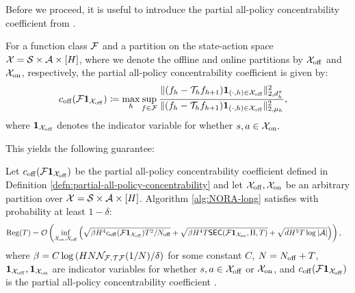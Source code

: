 Before we proceed, it is useful to introduce the partial all-policy concentrability coefficient from \citet{tan2024natural}.
\begin{defn}
    For a function class ${\mathcal{F}}$ and a partition on the state-action space ${\mathcal{X}} = {\mathcal{S}} \times {\mathcal{A}} \times [H]$, where we denote the offline and online partitions by ${\mathcal{X}}_{{\operatorname{off}}}$ and ${\mathcal{X}}_{{\operatorname{on}}}$, respectively, the partial all-policy concentrability coefficient is given by:
    \begin{align*}
    c_{{\operatorname{off}}}({\mathcal{F}}\mathbf{1}_{{\mathcal{X}}_{{\operatorname{off}}}}) 
    &\coloneqq \max_h \sup_{f \in {\mathcal{F}}} \frac{\|(f_h - {\mathcal{T}}_h f_{h+1}) \mathbf{1}_{(\cdot, h) \in {\mathcal{X}}_{{\operatorname{off}}}}\|_{2, d_h^\pi}^2}{\|(f_h - {\mathcal{T}}_h f_{h+1})\mathbf{1}_{(\cdot, h) \in {\mathcal{X}}_{{\operatorname{off}}}}\|_{2, \mu_{h}}^2},
    \end{align*}
    where $\mathbf{1}_{{\mathcal{X}}_{{\operatorname{off}}}}$ denotes the indicator variable for whether $s,a\in {\mathcal{X}}_{{\operatorname{on}}}.$
    \label{defn:partial-all-policy-concentrability}
\end{defn}

This yields the following guarantee:


\begin{thm}
\label{thm:hybrid-nora-regret_bound}
Let $c_{{\operatorname{off}}}({\mathcal{F}}\mathbf{1}_{{\mathcal{X}}_{{\operatorname{off}}}})$ be the partial all-policy concentrability coefficient defined in Definition \ref{defn:partial-all-policy-concentrability} and let ${\mathcal{X}}_{{\operatorname{off}}}, {\mathcal{X}}_{{\operatorname{on}}}$ be an arbitrary partition over ${\mathcal{X}} = {\mathcal{S}} \times {\mathcal{A}} \times [H]$. 
Algorithm \ref{alg:NORA-long} satisfies with probability at least $1-\delta$:
\begin{align}
    &\mathrm{Reg}(T)
    = {\mathcal{O}}\left(\inf_{{\mathcal{X}}_{{\operatorname{on}}}, {\mathcal{X}}_{{\operatorname{off}}}} \left(\sqrt{\beta H^4c_{{\operatorname{off}}}({\mathcal{F}}\mathbf{1}_{{\mathcal{X}}_{{\operatorname{off}}}})T^2/N_{{\operatorname{off}}}} + \sqrt{\beta H^4 T \mathsf{SEC}({\mathcal{F}} \mathbf{1}_{{\mathcal{X}}_{{\operatorname{on}}}}, \Pi, T)} + \sqrt{dH^5T \log|{\mathcal{A}}|}\right)\right),
\end{align}
where 
$\beta = C\log \left(HN \mathcal{N}_{\mathcal{{\mathcal{F}}, {\mathcal{T}}{\mathcal{F}}}}(1/N) / \delta\right)$ for some constant $C$, $N = N_{{\operatorname{off}}} + T$, $\mathbf{1}_{{\mathcal{X}}_{{\operatorname{off}}}}, \mathbf{1}_{{\mathcal{X}}_{{\operatorname{on}}}}$ are indicator variables for whether $s,a\in{\mathcal{X}}_{{\operatorname{off}}}$ or ${\mathcal{X}}_{{\operatorname{on}}}$, and $c_{{\operatorname{off}}}({\mathcal{F}}\mathbf{1}_{{\mathcal{X}}_{{\operatorname{off}}}})$ is the partial all-policy concentrability coefficient \citep{tan2024natural}.
\end{thm}

